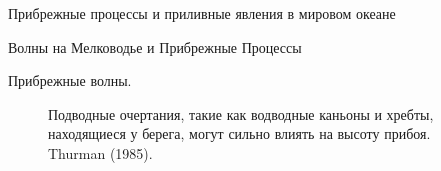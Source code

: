 \begin{chapter}{Прибрежные процессы и приливные явления в мировом океане}
\begin{section}{Волны на Мелководье и Прибрежные Процессы}
\begin{paragraph}{Прибрежные волны.}
\begin{figure}[b!]
\begin{centering}
\end{centering}
\caption{Подводные очертания, такие как водводные каньоны и хребты,
находящиеся у берега, могут сильно влиять на высоту прибоя. Thurman (1985).}
\label{wavefocusing}
\end{figure}
%
%


\end{paragraph}
\end{section}
\end{chapter}
